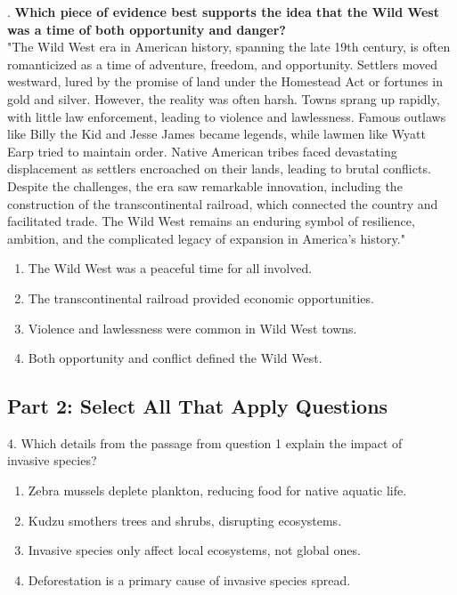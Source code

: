 \documentclass[12pt]{article}
\begin{document}
\vspace{1cm}
. \textbf{Which piece of evidence best supports the idea that the Wild West was a time of both opportunity and danger? }\\  
"The Wild West era in American history, spanning the late 19th century, is often romanticized as a time of adventure, freedom, and opportunity. Settlers moved westward, lured by the promise of land under the Homestead Act or fortunes in gold and silver. However, the reality was often harsh. Towns sprang up rapidly, with little law enforcement, leading to violence and lawlessness. Famous outlaws like Billy the Kid and Jesse James became legends, while lawmen like Wyatt Earp tried to maintain order. Native American tribes faced devastating displacement as settlers encroached on their lands, leading to brutal conflicts. Despite the challenges, the era saw remarkable innovation, including the construction of the transcontinental railroad, which connected the country and facilitated trade. The Wild West remains an enduring symbol of resilience, ambition, and the complicated legacy of expansion in America’s history."  
\begin{enumerate}[label=\Alph*.]
    \item The Wild West was a peaceful time for all involved.  
    \item The transcontinental railroad provided economic opportunities.  
    \item Violence and lawlessness were common in Wild West towns.  
    \item Both opportunity and conflict defined the Wild West.  
\end{enumerate}




\subsection*{Part 2: Select All That Apply Questions}

4. Which details from the passage from question 1 explain the impact of \\invasive species?  
\begin{enumerate}[label=\Alph*.]
    \item Zebra mussels deplete plankton, reducing food for native aquatic life.  
    \item Kudzu smothers trees and shrubs, disrupting ecosystems.  
    \item Invasive species only affect local ecosystems, not global ones.  
    \item Deforestation is a primary cause of invasive species spread.  
\end{enumerate}
\end{document}
